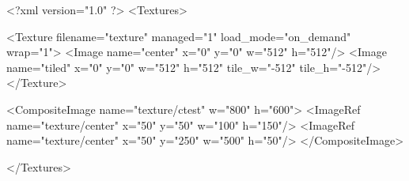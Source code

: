<?xml version="1.0" ?>
<Textures>

	<Texture filename="texture" managed="1" load_mode="on_demand" wrap="1">
		<Image name="center" x="0" y="0" w="512" h="512"/>
		<Image name="tiled" x="0" y="0" w="512" h="512" tile_w="-512" tile_h="-512"/>
	</Texture>
	
	<CompositeImage name="texture/ctest" w="800" h="600">
		<ImageRef name="texture/center" x="50" y="50" w="100" h="150"/>
		<ImageRef name="texture/center" x="50" y="250" w="500" h="50"/>
	</CompositeImage>

</Textures>
